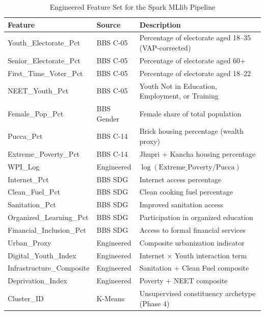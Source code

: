 \documentclass[12pt, a4paper]{article}
\begin{document}
\begin{table}[H]
\centering
\caption{Engineered Feature Set for the Spark MLlib Pipeline}
\label{tab:features}
\small
\begin{tabularx}{\textwidth}{l l X}
\toprule
\textbf{Feature} & \textbf{Source} & \textbf{Description} \\
\midrule
Youth\_Electorate\_Pct & BBS C-05 & Percentage of electorate aged 18--35 (VAP-corrected) \\
Senior\_Electorate\_Pct & BBS C-05 & Percentage of electorate aged 60+ \\
First\_Time\_Voter\_Pct & BBS C-05 & Percentage of electorate aged 18--22 \\
NEET\_Youth\_Pct & BBS C-05 & Youth Not in Education, Employment, or Training \\
Female\_Pop\_Pct & BBS Gender & Female share of total population \\
Pucca\_Pct & BBS C-14 & Brick housing percentage (wealth proxy) \\
Extreme\_Poverty\_Pct & BBS C-14 & Jhupri + Kancha housing percentage \\
WPI\_Log & Engineered & $\log(\text{Extreme\_Poverty} / \text{Pucca})$ \\
Internet\_Pct & BBS SDG & Internet access percentage \\
Clean\_Fuel\_Pct & BBS SDG & Clean cooking fuel percentage \\
Sanitation\_Pct & BBS SDG & Improved sanitation access \\
Organized\_Learning\_Pct & BBS SDG & Participation in organized education \\
Financial\_Inclusion\_Pct & BBS SDG & Access to formal financial services \\
Urban\_Proxy & Engineered & Composite urbanization indicator \\
Digital\_Youth\_Index & Engineered & Internet $\times$ Youth interaction term \\
Infrastructure\_Composite & Engineered & Sanitation + Clean Fuel composite \\
Deprivation\_Index & Engineered & Poverty + NEET composite \\
Cluster\_ID & K-Means & Unsupervised constituency archetype (Phase 4) \\
\bottomrule
\end{tabularx}
\end{table}

\end{document}
